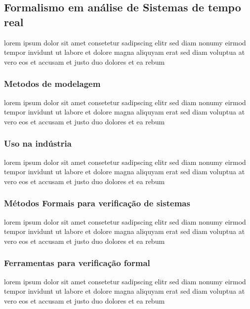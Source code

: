 \subsection{Formalismo em análise de Sistemas de tempo real}
lorem ipsum dolor sit amet consetetur sadipscing elitr sed diam nonumy
eirmod tempor invidunt ut labore et dolore magna aliquyam erat sed diam
voluptua at vero eos et accusam et justo duo dolores et ea rebum

\subsubsection{Metodos de modelagem}
lorem ipsum dolor sit amet consetetur sadipscing elitr sed diam nonumy
eirmod tempor invidunt ut labore et dolore magna aliquyam erat sed diam
voluptua at vero eos et accusam et justo duo dolores et ea rebum

\subsubsection{Uso na indústria}
lorem ipsum dolor sit amet consetetur sadipscing elitr sed diam nonumy
eirmod tempor invidunt ut labore et dolore magna aliquyam erat sed diam
voluptua at vero eos et accusam et justo duo dolores et ea rebum

\subsubsection{Métodos Formais para verificação de sistemas}
lorem ipsum dolor sit amet consetetur sadipscing elitr sed diam nonumy
eirmod tempor invidunt ut labore et dolore magna aliquyam erat sed diam
voluptua at vero eos et accusam et justo duo dolores et ea rebum

\subsubsection{Ferramentas para verificação formal}
lorem ipsum dolor sit amet consetetur sadipscing elitr sed diam nonumy
eirmod tempor invidunt ut labore et dolore magna aliquyam erat sed diam
voluptua at vero eos et accusam et justo duo dolores et ea rebum

